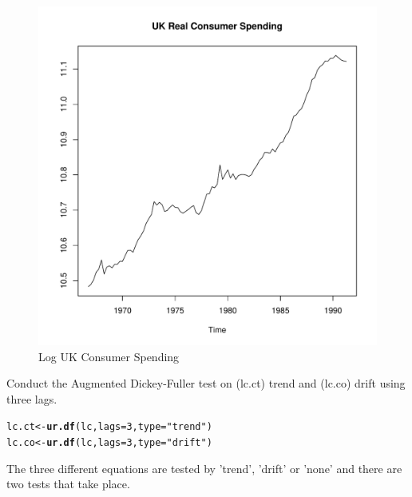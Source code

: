 \documentclass{article}\usepackage{graphicx, color}
\makeatletter
\def\maxwidth{ %
  \ifdim\Gin@nat@width>\linewidth
    \linewidth
  \else
    \Gin@nat@width
  \fi
}
\newcommand{\hlfunctioncall}[1]{\textcolor[rgb]{0.501960784313725,0,0.329411764705882}{\textbf{#1}}}%
\newcommand{\hlstring}[1]{\textcolor[rgb]{0.6,0.6,1}{#1}}%
\newenvironment{kframe}{%
 \def\at@end@of@kframe{}%
 \ifinner\ifhmode%
  \def\at@end@of@kframe{\end{minipage}}%
  \begin{minipage}{\columnwidth}%
 \fi\fi%
 \def\FrameCommand##1{\hskip\@totalleftmargin \hskip-\fboxsep
 \colorbox{shadecolor}{##1}\hskip-\fboxsep
     \hskip-\linewidth \hskip-\@totalleftmargin \hskip\columnwidth}%
 \MakeFramed {\advance\hsize-\width
   \@totalleftmargin\z@ \linewidth\hsize
   \@setminipage}}%
 {\par\unskip\endMakeFramed%
 \at@end@of@kframe}
\newenvironment{knitrout}{}{} %
\makeatother
\begin{document}
\begin{knitrout}
\color{fgcolor}\begin{figure}[h]

\includegraphics[width=\maxwidth]{figure/plotlc} \caption[Log UK Consumer Spending]{Log UK Consumer Spending\label{fig:plotlc}}
\end{figure}


\end{knitrout}

Conduct the Augmented Dickey-Fuller test on (lc.ct) trend and (lc.co) drift using three lags. 
\begin{knitrout}
\color{fgcolor}\begin{kframe}
\begin{alltt}
lc.ct <- \hlfunctioncall{ur.df}(lc, lags = 3, type = \hlstring{"trend"})
lc.co <- \hlfunctioncall{ur.df}(lc, lags = 3, type = \hlstring{"drift"})
\end{alltt}
\end{kframe}
\end{knitrout}

The three different equations are tested by 'trend', 'drift' or 'none' and there are two tests that take place. 
\end{document}
